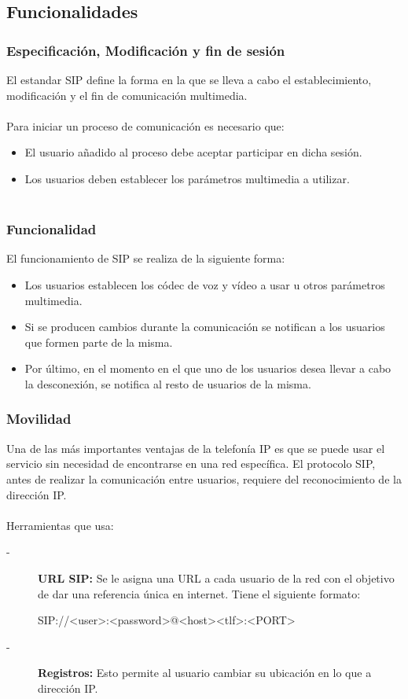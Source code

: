 \documentclass{beamer}
\begin{document}
\subsection{Funcionalidades}
\begin{frame}
\frametitle{Especificación, Modificación y fin de sesión}
El estandar SIP define la forma en la que se lleva a cabo el establecimiento, modificación y el fin de comunicación multimedia. \\~\\
Para iniciar un proceso de comunicación es necesario que:
		\begin{itemize}
			\item El usuario añadido al proceso debe aceptar participar en dicha sesión.
			\item Los usuarios deben establecer los parámetros multimedia a utilizar.\\~\\
		\end{itemize}
\end{frame}
\begin{frame}
\frametitle{Funcionalidad}
		El funcionamiento de SIP se realiza de la siguiente forma:
		\begin{itemize}
			\item Los usuarios establecen los códec de voz y vídeo a usar u otros parámetros multimedia.
			\item Si se producen cambios durante la comunicación se notifican a los usuarios que formen parte de la misma.
			\item Por último, en el momento en el que uno de los usuarios desea llevar a cabo la desconexión, se notifica al resto de usuarios de la misma.
		\end{itemize}
\end{frame}
\begin{frame}
\frametitle{Movilidad}
		Una de las más importantes ventajas de la telefonía IP es que se puede usar el servicio sin necesidad de encontrarse en una red específica. El protocolo SIP, antes de realizar la comunicación entre usuarios, requiere del reconocimiento de la dirección IP.\\~\\
	Herramientas que usa:
		\begin{description}
		\item[-]\textbf{URL SIP:} Se le asigna una URL a cada usuario de la red con el objetivo de dar una referencia única en internet. Tiene el siguiente formato:\\
		\begin{example}
		SIP://<user>:<password>@<host><tlf>:<PORT>
		\end{example}

		\item[-]\textbf{Registros:} Esto permite al usuario cambiar su ubicación en lo que a dirección IP.
		\end{description}
\end{frame}
\end{document}
